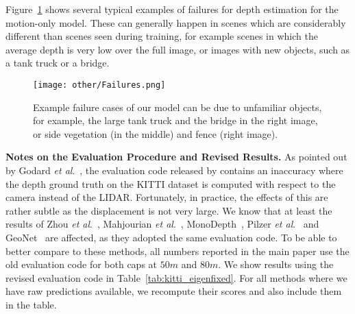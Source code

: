 \documentclass[10pt,twocolumn,letterpaper]{article}
\newcommand{\ea}{\textit{et al}.}
\begin{document}
Figure~\ref{fig:result_failures} shows several typical examples of failures for depth estimation for the motion-only model. These can generally happen in scenes which are considerably different than scenes seen during training, for example scenes in which the average depth is very low over the full image, or images with new objects, such as a tank truck or a bridge.  

\begin{figure}
    \begin{center}
    \texttt{[image: other/Failures.png]}
    \end{center}
    \caption{Example failure cases of our model can be due to unfamiliar objects, for example, the large tank truck and the bridge in the right image, or side vegetation (in the middle) and fence (right image).}
    \label{fig:result_failures}
\end{figure}

\textbf{Notes on the Evaluation Procedure and Revised Results.}
As pointed out by Godard \ea~\cite{godard2018digging}, the evaluation code released by \cite{zhou2017unsupervised} contains an inaccuracy where the depth ground truth on the KITTI dataset is computed with respect to the camera instead of the LIDAR. Fortunately, in practice, the effects of this are rather subtle as the displacement is not very large. We know that at least the results of Zhou \ea~\cite{zhou2017unsupervised}, Mahjourian \ea~\cite{mahjourian2018unsupervised}, MonoDepth~\cite{godard2017monodepth}, Pilzer \ea~\cite{pilzer2018unsupervised} and GeoNet~\cite{yin2018geonet} are affected, as they adopted the same evaluation code. To be able to better compare to these methods, all numbers reported in the main paper use the old evaluation code for both caps at $50m$ and $80m$. We show results using the revised evaluation code in Table~\ref{tab:kitti_eigenfixed}. For all methods where we have raw predictions available, we recompute their scores and also include them in the table.
\end{document}
